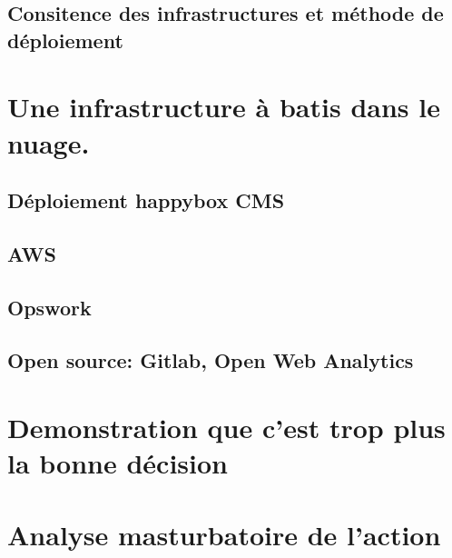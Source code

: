 \documentclass[11pt, a4paper ]{article}
\let\stdsection\section
\renewcommand\section{\newpage\stdsection}
\begin{document}
\begin{spacing}{1.5}
			\subsection{Consitence des infrastructures et méthode de déploiement}



		\section{Une infrastructure à batis dans le nuage.}	 %

			\subsection{Déploiement happybox CMS}
			\subsection{AWS}

			\subsection{Opswork}

			\subsection{Open source: Gitlab, Open Web Analytics}




		\section{Demonstration que c'est trop plus la bonne décision} %

		\section{Analyse masturbatoire de l'action} %


\end{spacing}
\end{document}
